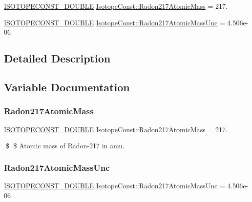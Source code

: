 \begin{DoxyCompactItemize}
\item 
\mbox{\hyperlink{group___isotope_const-_macros_ga8f45a7272ce02c0b4c65c44636ed719a}{I\+S\+O\+T\+O\+P\+E\+C\+O\+N\+S\+T\+\_\+\+D\+O\+U\+B\+LE}} \mbox{\hyperlink{group___isotope_const-_radon-_rn217_ga49a33a8c88e149ecaf80c4da4cb5256e}{Isotope\+Const\+::\+Radon217\+Atomic\+Mass}} = 217.
\item 
\mbox{\hyperlink{group___isotope_const-_macros_ga8f45a7272ce02c0b4c65c44636ed719a}{I\+S\+O\+T\+O\+P\+E\+C\+O\+N\+S\+T\+\_\+\+D\+O\+U\+B\+LE}} \mbox{\hyperlink{group___isotope_const-_radon-_rn217_gae19ce10abb585d5b2bd76e02c5be10a1}{Isotope\+Const\+::\+Radon217\+Atomic\+Mass\+Unc}} = 4.\+506e-\/06
\end{DoxyCompactItemize}


\subsection{Detailed Description}


\subsection{Variable Documentation}
\mbox{\label{group___isotope_const-_radon-_rn217_ga49a33a8c88e149ecaf80c4da4cb5256e}} 
\subsubsection{\texorpdfstring{Radon217\+Atomic\+Mass}{Radon217AtomicMass}}
{\footnotesize\ttfamily \mbox{\hyperlink{group___isotope_const-_macros_ga8f45a7272ce02c0b4c65c44636ed719a}{I\+S\+O\+T\+O\+P\+E\+C\+O\+N\+S\+T\+\_\+\+D\+O\+U\+B\+LE}} Isotope\+Const\+::\+Radon217\+Atomic\+Mass = 217.}

\$ \$ Atomic mass of Radon-\/217 in amu. \mbox{\label{group___isotope_const-_radon-_rn217_gae19ce10abb585d5b2bd76e02c5be10a1}} 
\subsubsection{\texorpdfstring{Radon217\+Atomic\+Mass\+Unc}{Radon217AtomicMassUnc}}
{\footnotesize\ttfamily \mbox{\hyperlink{group___isotope_const-_macros_ga8f45a7272ce02c0b4c65c44636ed719a}{I\+S\+O\+T\+O\+P\+E\+C\+O\+N\+S\+T\+\_\+\+D\+O\+U\+B\+LE}} Isotope\+Const\+::\+Radon217\+Atomic\+Mass\+Unc = 4.\+506e-\/06}

